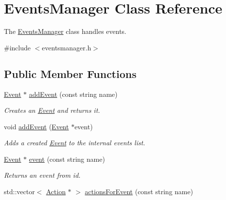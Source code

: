 \hypertarget{classEventsManager}{
\section{EventsManager Class Reference}
\label{classEventsManager}
}


The \hyperlink{classEventsManager}{EventsManager} class handles events.  




{\ttfamily \#include $<$eventsmanager.h$>$}

\subsection*{Public Member Functions}
\begin{DoxyCompactItemize}
\item 
\hypertarget{classEventsManager_a4944891c51514d1ecb7f46fabbfd635a}{
\hyperlink{classEvent}{Event} $\ast$ \hyperlink{classEventsManager_a4944891c51514d1ecb7f46fabbfd635a}{addEvent} (const string name)}
\label{classEventsManager_a4944891c51514d1ecb7f46fabbfd635a}

\begin{DoxyCompactList}\small\item\em Creates an \hyperlink{classEvent}{Event} and returns it. \item\end{DoxyCompactList}\item 
\hypertarget{classEventsManager_ac14e82d37534762028f3fe51d57f5f9d}{
void \hyperlink{classEventsManager_ac14e82d37534762028f3fe51d57f5f9d}{addEvent} (\hyperlink{classEvent}{Event} $\ast$event)}
\label{classEventsManager_ac14e82d37534762028f3fe51d57f5f9d}

\begin{DoxyCompactList}\small\item\em Adds a created \hyperlink{classEvent}{Event} to the internal events list. \item\end{DoxyCompactList}\item 
\hypertarget{classEventsManager_abb1f3773a62bc7d4842b2a55e547fa72}{
\hyperlink{classEvent}{Event} $\ast$ \hyperlink{classEventsManager_abb1f3773a62bc7d4842b2a55e547fa72}{event} (const string name)}
\label{classEventsManager_abb1f3773a62bc7d4842b2a55e547fa72}

\begin{DoxyCompactList}\small\item\em Returns an event from id. \item\end{DoxyCompactList}\item 
\hypertarget{classEventsManager_a7a4bf8bde02ee517907803eb7365876d}{
std::vector$<$ \hyperlink{classAction}{Action} $\ast$ $>$ \hyperlink{classEventsManager_a7a4bf8bde02ee517907803eb7365876d}{actionsForEvent} (const string name)}
\label{classEventsManager_a7a4bf8bde02ee517907803eb7365876d}


\end{DoxyCompactItemize}
